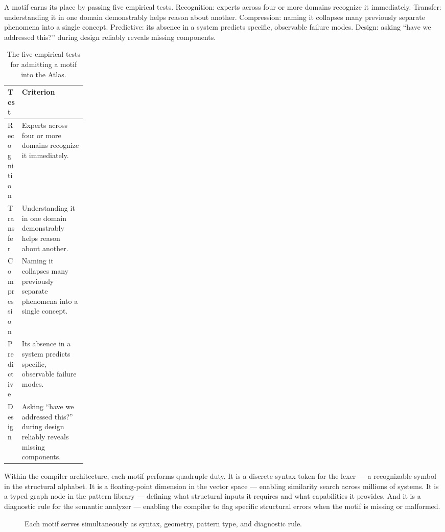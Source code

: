 \documentclass[11pt,a4paper]{article}
\begin{document}
A motif earns its place by passing five empirical tests. Recognition: experts across four or more domains recognize it immediately. Transfer: understanding it in one domain demonstrably helps reason about another. Compression: naming it collapses many previously separate phenomena into a single concept. Predictive: its absence in a system predicts specific, observable failure modes. Design: asking ``have we addressed this?'' during design reliably reveals missing components.

\begin{table}[ht]
\centering
\caption{The five empirical tests for admitting a motif into the Atlas.}
\begin{tabularx}{\linewidth}{@{}L{0.18\linewidth}Y@{}}
\toprule
\textbf{Test} & \textbf{Criterion} \\
\midrule
Recognition & Experts across four or more domains recognize it immediately. \\
Transfer & Understanding it in one domain demonstrably helps reason about another. \\
Compression & Naming it collapses many previously separate phenomena into a single concept. \\
Predictive & Its absence in a system predicts specific, observable failure modes. \\
Design & Asking ``have we addressed this?'' during design reliably reveals missing components. \\
\bottomrule
\end{tabularx}
\end{table}

Within the compiler architecture, each motif performs quadruple duty. It is a discrete syntax token for the lexer --- a recognizable symbol in the structural alphabet. It is a floating-point dimension in the vector space --- enabling similarity search across millions of systems. It is a typed graph node in the pattern library --- defining what structural inputs it requires and what capabilities it provides. And it is a diagnostic rule for the semantic analyzer --- enabling the compiler to flag specific structural errors when the motif is missing or malformed.

\begin{figure}[ht]
\centering
{}
\caption{Each motif serves simultaneously as syntax, geometry, pattern type, and diagnostic rule.}
\end{figure}
\end{document}
